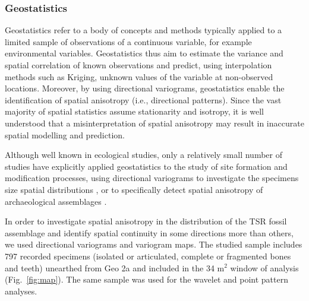 \documentclass[5p,times,authoryear]{elsarticle}
\begin{document}
\subsubsection{Geostatistics}

Geostatistics refer to a body of concepts and methods typically applied to a limited sample of observations of a continuous variable, for example environmental variables. Geostatistics thus aim to estimate the variance and spatial correlation of known observations and predict, using interpolation methods such as Kriging, unknown values of the variable at non-observed locations. Moreover, by using directional variograms, geostatistics enable the identification of spatial anisotropy (i.e., directional patterns). Since the vast majority of spatial statistics assume stationarity and isotropy, it is well understood that a misinterpretation of spatial anisotropy may result in inaccurate spatial modelling and prediction.

Although well known in ecological studies, only a relatively small number of studies have explicitly applied geostatistics to the study of site formation and modification processes, using directional variograms to investigate the specimens size spatial distributions \citep{Dominguez-Rodrigo2014b,Dominguez-Rodrigo2014c}, or to specifically detect spatial anisotropy of archaeological assemblages \citep{Bevan2009,Markofsky2012}.

In order to investigate spatial anisotropy in the distribution of the TSR fossil assemblage and identify spatial continuity in some directions more than others, we used directional variograms and variogram maps. The studied sample includes 797 recorded specimens (isolated or articulated, complete or fragmented bones and teeth) unearthed from Geo 2a and included in the 34 m$^2$ window of analysis (Fig.~\ref{fig:map}). The same sample was used for the wavelet and point pattern analyses.
\end{document}
